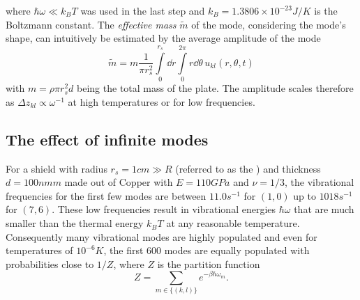 where $\hbar\omega \ll k_B T$ was used in the last step and $k_B = 1.3806\times 10^{-23} \si{J/K}$ is the Boltzmann constant.
The \textit{effective mass} $\tilde{m}$ of the mode, considering the mode's shape, can intuitively be estimated by the average amplitude of the mode 
\begin{equation}\label{eq:5:effective-mass}
  \tilde{m} = m\frac{1}{\pi r_s^2}\int\limits_0^{r_s} \dd r \int\limits_0^{2\pi} r\dd\theta \, u_{kl}(r, \theta, t)
\end{equation}
with $m=\rho \pi r_s^2 d$ being the total mass of the plate.
The amplitude scales therefore as $\Delta z_{kl} \propto \omega^{-1}$ at high temperatures or for low frequencies.




\subsection*{The effect of infinite modes}
For a shield with radius $r_s = 1\si{cm} \gg R$ (referred to as the ) and thickness $d=100\si{nmm}$ made out of Copper with $E = 110\si{GPa}$ and $\nu = 1/3$, the vibrational frequencies for the first few modes are between $11.0\si{s^{-1}}$ for $(1,0)$ up to $1018\si{s^{-1}}$ for $(7,6)$.
These low frequencies result in vibrational energies $\hbar \omega$ that are much smaller than the thermal energy $k_B T$ at any reasonable temperature.
Consequently many vibrational modes are highly populated and even for temperatures of $10^{-6}\si{K}$, the first 600 modes are equally populated with probabilities close to $1/Z$, where $Z$ is the partition function
\begin{equation}
  Z = \sum_{m\in\{(k,l)\}} e^{-\beta \hbar \omega_m} .
\end{equation}

